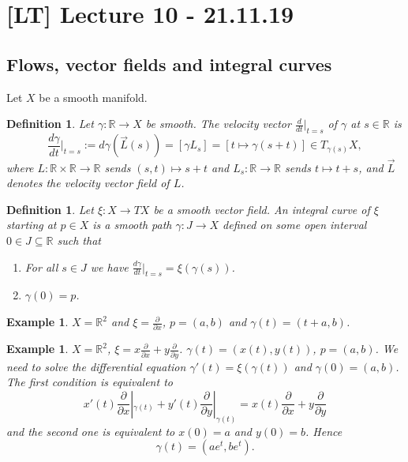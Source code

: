 \documentclass[12pt]{article}
\theoremstyle{darkgreentheorem}
\theoremstyle{darkbluedefinition}
\newtheorem{defn}[thm]{Definition}
\theoremstyle{darkredexample}
\newtheorem{exa}[thm]{Example}
\theoremstyle{remark}
\newcommand{\R}{\mathbb{R}}
\newcommand{\1}{\mathbbm{1}}
\newcommand{\tms}{\times}
\newcommand{\sub}{\subseteq}
\begin{document}
\section{[LT] Lecture 10 - 21.11.19}

\subsection{Flows, vector fields and integral curves}

Let $X$ be a smooth manifold.

\begin{defn}
    Let $\gamma\colon \R\to X$ be smooth.
    The \textit{velocity vector} $\frac{d}{dt}|_{t=s}$ of $\gamma$ at $s\in \R$ is
    \[ \frac{d\gamma}{dt}|_{t=s}:=d\gamma(\vec{L}(s))=[\gamma L_{s}]=[t\mapsto \gamma(s+t)]\in T_{\gamma(s)}X, \]
    where $L\colon \R\tms \R\to \R$ sends $(s,t)\mapsto s+t$ and $L_{s}\colon \R\to \R$ sends $t\mapsto t
    +s$, and $\vec{L}$ denotes the velocity vector field of $L$.
\end{defn}

\begin{defn}
    Let $\xi\colon X\to TX$ be a smooth vector field.
    An \textit{integral curve} of $\xi$ starting at $p\in X$ is a smooth path $\gamma\colon J\to X$ defined on some open interval $0\in J\sub \R$ such that
    \begin{enumerate}
	\item For all $s\in J$ we have $\frac{d\gamma}{dt}|_{t=s}=\xi(\gamma(s))$.
	\item $\gamma(0)=p$.
    \end{enumerate}
\end{defn}

\begin{exa}
    $X=\R^{2}$ and $\xi=\frac{\partial}{\partial x}$, $p=(a,b)$ and $\gamma(t)=(t+a,b)$.
\end{exa}

\begin{exa}
    $X=\R^{2}$, $\xi=x\frac{\partial}{\partial x}+y\frac{\partial}{\partial y}$.
    $\gamma(t)=(x(t),y(t))$, $p=(a,b)$.
    We need to solve the differential equation $\gamma'(t)=\xi(\gamma(t))$ and $\gamma(0)=(a,b)$.
    The first condition is equivalent to
    \[ x'(t)\frac{\partial}{\partial x}|_{\gamma(t)}+y'(t)\frac{\partial }{\partial y}|_{\gamma(t)}=x(t)\frac{\partial }{\partial x} + y\frac{\partial }{\partial y} \]
    and the second one is equivalent to $x(0)=a$ and $y(0)=b$.
    Hence
    \[ \gamma(t)=(ae^{t},be^{t}).\]
\end{exa}
\end{document}
